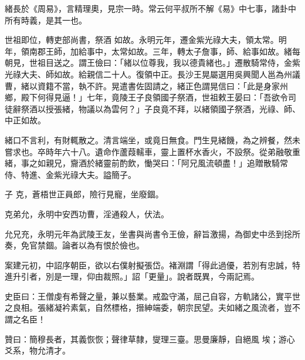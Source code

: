 \begin{pinyinscope}
 緒長於《周易》，言精理奧，見宗一時。常云何平叔所不解《易》中七事，諸卦中所有時義，是其一也。



 世祖即位，轉吏部尚書，祭酒
 如故。永明元年，遷金紫光祿大夫，領太常。明年，領南郡王師，加給事中，太常如故。三年，轉太子詹事，師、給事如故。緒每朝見，世祖目送之。謂王儉曰：「緒以位尊我，我以德貴緒也。」遷散騎常侍，金紫光祿大夫、師如故。給親信二十人。復領中正。長沙王晃屬選用吳興聞人邕為州議曹，緒以資籍不當，執不許。晃遣書佐固請之，緒正色謂晃信曰：「此是身家州鄉，殿下何得見逼！」七年，竟陵王子良領國子祭酒，世祖敕王晏曰：「吾欲令司徒辭祭酒以授張緒，物議以為雲何？」子良竟不拜，以緒領國子祭酒，光祿、師、中正如故。



 緒口不言利，有財輒散之。清言端坐，或竟日無食。門生見緒饑，為之辨餐，然未嘗求也。卒時年六十八。遺命作蘆葭轜車，靈上置杯水香火，不設祭。從弟融敬重緒，事之如親兄，齎酒於緒靈前酌飲，慟哭曰：「阿兄風流頓盡！」追贈散騎常侍、特進、金紫光祿大夫。謚簡子。



 子
 克，蒼梧世正員郎，險行見寵，坐廢錮。



 克弟允，永明中安西功曹，淫通殺人，伏法。



 允兄充，永明元年為武陵王友，坐書與尚書令王儉，辭旨激揚，為御史中丞到捴所奏，免官禁錮。論者以為有恨於儉也。



 案建元初，中詔序朝臣，欲以右僕射擬張岱。褚淵謂「得此過優，若別有忠誠，特進升引者，別是一理，仰由裁照。」詔「更量」。說者既異，今兩記焉。



 史臣曰：王僧虔有希聲之量，兼以藝業。戒盈守滿，屈己自容，方軌諸公，實平世之良相。張緒凝衿素氣，自然標格，搢紳端委，朝宗民望。夫如緒之風流者，豈不謂之名臣！



 贊曰：簡穆長者，其義恢恢；聲律草隸，燮理三臺。思曼廉靜，自絕風
 埃；游心爻系，物允清才。



\end{pinyinscope}